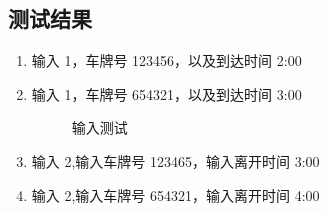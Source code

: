 \documentclass[UTF8,titlepage]{ctexart}
\numberwithin{figure}{section}
\begin{document}
\subsection{测试结果}
\begin{enumerate}
    \item 输入 1，车牌号 123456，以及到达时间 2:00
    \item 输入 1，车牌号 654321，以及到达时间 3:00{
        \begin{figure}[H]
        \centering
         \caption{输入测试}
         \label{}
        \end{figure}
    }
    \item 输入 2,输入车牌号 123465，输入离开时间 3:00
    \item 输入 2,输入车牌号 654321，输入离开时间 4:00{
        \begin{figure}[H]
        \centering

\end{figure}}
\end{enumerate}
\end{document}
